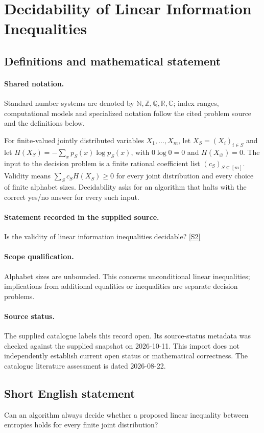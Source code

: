 \documentclass[11pt]{article}
\newcommand{\sref}[2]{\hyperlink{source:#1:#2}{[S#2]}}
\begin{document}
\section{Decidability of Linear Information Inequalities}\label{statement}

\subsection{Definitions and mathematical statement}

\paragraph{Shared notation.}Standard number systems are denoted by $\mathbb N,\mathbb Z,\mathbb Q,\mathbb R,\mathbb C$; index ranges, computational models and specialized notation follow the cited problem source and the definitions below.


For finite-valued jointly distributed variables $X_1,\ldots,X_m$, let $X_S=(X_i)_{i\in S}$ and let $H(X_S)=-\sum_x p_S(x)\log p_S(x)$, with $0\log0=0$ and $H(X_\varnothing)=0$. The input to the decision problem is a finite rational coefficient list $(c_S)_{S\subseteq[m]}$. Validity means $\sum_S c_SH(X_S)\geq0$ for every joint distribution and every choice of finite alphabet sizes. Decidability asks for an algorithm that halts with the correct yes/no answer for every such input.
\paragraph{Statement recorded in the supplied source.}
Is the validity of linear information inequalities decidable? \sref{statement}{2}
\paragraph{Scope qualification.}
Alphabet sizes are unbounded. This concerns unconditional linear inequalities; implications from additional equalities or inequalities are separate decision problems.
\paragraph{Source status.}
The supplied catalogue labels this record open. Its source-status metadata was checked against the supplied snapshot on 2026-10-11. This import does not independently establish current open status or mathematical correctness. The catalogue literature assessment is dated 2026-08-22.
\subsection{Short English statement}
Can an algorithm always decide whether a proposed linear inequality between entropies holds for every finite joint distribution?
\end{document}

